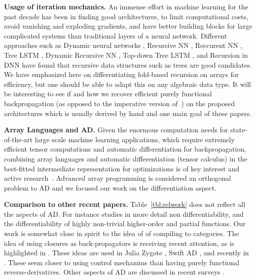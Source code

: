 \noindent \textbf{Usage of iteration mechanics.}
An immense effort in machine learning for the past decade has been in finding
good architectures, to limit computational costs, 
avoid vanishing and exploding gradients, 
and have better building blocks for large complicated systems than traditional layers of a neural network.
Different approaches such as Dynamic neural networks \cite{jin2017manipulability,wu2016deep}, 
Recursive NN \cite{socher2011parsing,biancofiore2017recursive}, 
Reccurent NN \cite{bahdanau2014neural,luong2015effective}, 
Tree LSTM \cite{tai2015improved,chen2016enhanced}, 
Dynamic Recursive NN \cite{guo2019dynamic}, 
Top-down Tree LSTM \cite{zhang2015top}, and
Recursion in DNN \cite{jeong2018improving}
have found that recursive data structures such as trees are good candidates.
We have emphasized here on differentiating fold-based recursion on arrays for efficiency, 
but one should be able to adapt this on any algebraic data type. 
It will be interesting to see if and how we recover efficient purely functional backpropagation (as opposed to the imperative version of~\cite{lantern_icfp}) on the proposed architectures 
which is usually derived by hand and one main goal of these papers.

\noindent \textbf{Array Languages and AD.}
Given the enormous computation needs for state-of-the-art large scale machine learning applications, 
which require extremely efficient tensor computations and automatic differentiation for backpropagation, 
combining array languages and automatic differentiation (tensor calculus) in the best-fitted 
intermediate representation for optimizations is of key interest and active research~\cite{bernstein2020differentiating,laue2018computing,laue2020simple}. 
Advanced array programming is considered an orthogonal problem to AD and we focused our work on the differentiation aspect.

\noindent \textbf{Comparison to other recent papers.}
Table~\ref{tbl:relwork} does not reflect all the aspects of AD. For instance \cite{lee2020correctness} studies in more detail non differentiability, 
and \cite{sherman2021} the differentiability of highly non-trivial higher-order and partial functions. 
Our work is somewhat close in spirit to the idea of \cite{elliott2018simple} of compiling to categories.
The idea of using closures as back-propagators is receiving recent attention, as is highlighted in \cite{vytiniotis2019differentiable,lantern_icfp}.
These ideas are used in Julia Zygote \cite{innes2019zygote}, Swift AD \cite{wei2018first}, and recently in \cite{paszke2021getting}.
These seem closer to using control mechanims than having purely functional reverse-derivatives.
Other aspects of AD are discussed in recent surveys \cite{van2018automatic,baydin2017automatic}.

